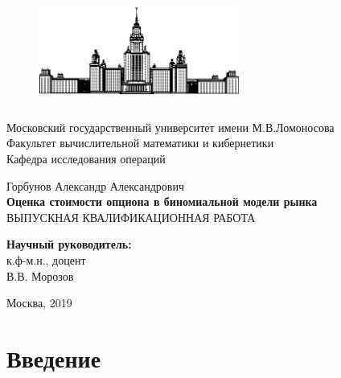 \documentclass[oneside,final,12pt]{article}
\begin{document}

\begin{figure}
\includegraphics[height=3.55cm,width=6.61cm]{msu.eps}
\centering
\end{figure}
\begin{center}
Московский государственный университет имени М.В.Ломоносова \\
\normalsize{Факультет вычислительной математики и кибернетики} \\
Кафедра исследования операций \\


\hfill \break
\hfill \break
\hfill \break

{\Large Горбунов Александр Александрович} \\
\hfill \break
{\LARGE \textbf{Оценка стоимости опциона в биномиальной модели рынка}} \\

\hfill \break
\hfill \break
\hfill \break
\textsc{ВЫПУСКНАЯ КВАЛИФИКАЦИОННАЯ  РАБОТА}
 
\end{center}
\hfill \break
\hfill \break
\hfill \break
 
\begin{flushright}
\textbf{Научный руководитель:} \\
\normalsize{к.ф-м.н., доцент} \\
В.В. Морозов \\
\end{flushright}

\hfill \break
\hfill \break
\hfill \break
\hfill \break
\hfill \break

\begin{center} Москва, 2019 \end{center}
\thispagestyle{empty} %


\newpage
\renewcommand\contentsname{Содержание}
\tableofcontents

\newpage
\section{Введение}
\end{document}
